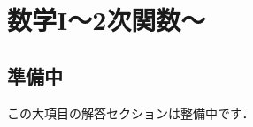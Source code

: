 \documentclass[../../ms_a.tex]{subfiles}
\begin{document}
\section{数学I～2次関数～}

\subsection*{準備中}
この大項目の解答セクションは整備中です．
\end{document}
